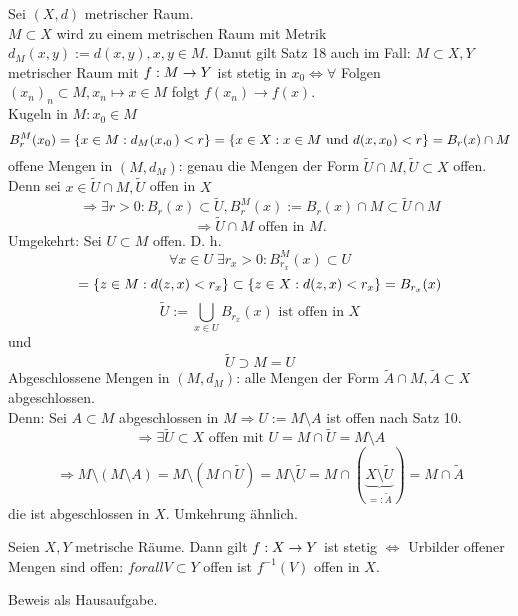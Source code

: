 \documentclass[../ana2.tex]{subfiles}
\begin{document}
\begin{bem}
    Sei \( (X, d) \) metrischer Raum. \\
    \(M \subset X\) wird zu einem metrischen Raum mit Metrik
    \( d_M(x,y) := d(x, y), x, y \in M \).
    Danut gilt Satz 18 auch im Fall:
    \( M \subset X, Y \) metrischer Raum mit \( f:M\rightarrow Y \)
    ist stetig in \(x_0 \Leftrightarrow \forall \) Folgen
    \( (x_n)_n \subset M, x_n \mapsto x \in M \) folgt
    \( f(x_n) \rightarrow f(x) \). \\
    Kugeln in \( M: x_0 \in M \)
    \[ B_r^M(x_0) = \{x \in M: d_M(x,_0) < r\}
    = \{x \in X: x \in M \text{ und } d(x, x_0) < r\}
    = B_r(x) \cap M \]
    offene Mengen in \( (M, d_M) \): genau die Mengen der
    Form \( \tilde{U} \cap M, \tilde{U} \subset X \) offen.\\
    Denn sei \( x \in \tilde{U} \cap M, \tilde{U}\) offen in \(X\)
    \[ \Rightarrow \exists r > 0: B_r(x) \subset \tilde{U},
    B_r^M(x)  := B_r(x) \cap M \subset \tilde{U} \cap M \]
    \[ \Rightarrow \tilde{U} \cap M \text{ offen in } M. \]
    Umgekehrt: Sei \( U \subset M \) offen. D. h.
    \[ \forall x \in U \; \exists r_x > 0: B_{r_x}^M(x) \subset U \]
    \[ = \{z \in M: d(z,x) < r_x\} \subset \{z \in X: d(z,x) < r_x\}
    = B_{r_x}(x) \]
    \[ \tilde{U} := \bigcup_{x \in U} B_{r_x}(x) \text{ ist offen in } X \]
    und
    \[ \tilde{U} \supset M = U \]
    Abgeschlossene Mengen in \( (M, d_M) \): alle Mengen der Form
    \( \tilde{A} \cap M, \tilde{A} \subset X \) abgeschlossen.\\
    Denn: Sei \(A \subset M\) abgeschlossen in \( M \Rightarrow
    U := M \setminus A \) ist offen nach Satz 10. 
    \[ \Rightarrow \exists \tilde{U} \subset X \text{ offen mit }
    U = M \cap \tilde{U} = M \setminus A \]
    \[ \Rightarrow M \setminus (M \setminus A) 
    = M \setminus (M \cap \tilde{U}) = M \setminus \tilde{U}
    = M \cap (\underbrace{X \setminus \tilde{U}}_{=: \tilde{A}}) 
    = M \cap \tilde{A} \]
    die ist abgeschlossen in \(X\). Umkehrung ähnlich.    
\end{bem}
\begin{satz}
    Seien \( X, Y \) metrische Räume. Dann gilt \( f:X\rightarrow Y \)
    ist stetig \( \Leftrightarrow \) Urbilder offener Mengen sind offen:
    \( forall V \subset Y \) offen ist \( f^{-1}(V) \) offen in \( X \).
\end{satz}
\begin{bew}
    Beweis als Hausaufgabe.
\end{bew}
\end{document}
